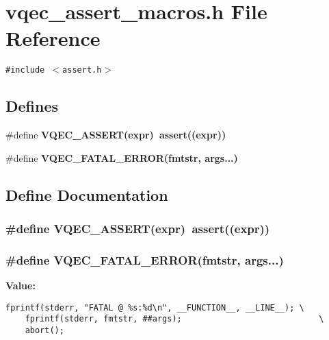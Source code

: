 \section{vqec\_\-assert\_\-macros.h File Reference}
\label{vqec__assert__macros_8h}
{\tt \#include $<$assert.h$>$}\par
\subsection*{Defines}
\begin{CompactItemize}
\item 
\#define \bf{VQEC\_\-ASSERT}(expr)~assert((expr))
\item 
\#define \bf{VQEC\_\-FATAL\_\-ERROR}(fmtstr, args...)
\end{CompactItemize}


\subsection{Define Documentation}
\subsubsection{\setlength{\rightskip}{0pt plus 5cm}\#define VQEC\_\-ASSERT(expr)~assert((expr))}\label{vqec__assert__macros_8h_b0a4ad404b585165b67fd08e0c8a2967}


\subsubsection{\setlength{\rightskip}{0pt plus 5cm}\#define VQEC\_\-FATAL\_\-ERROR(fmtstr, args...)}\label{vqec__assert__macros_8h_367695b146282f8fd2038d11790a11aa}


\textbf{Value:}

\begin{Code}\begin{verbatim}fprintf(stderr, "FATAL @ %s:%d\n", __FUNCTION__, __LINE__); \
    fprintf(stderr, fmtstr, ##args);                            \
    abort();
\end{verbatim}\end{Code}
